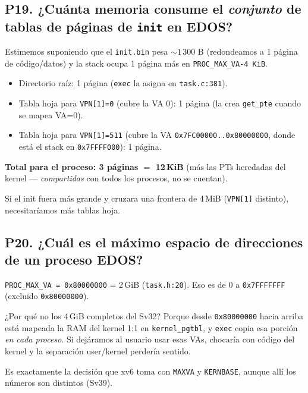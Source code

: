 \documentclass[11pt,a4paper]{article}
\begin{document}
\subsection*{P19. ¿Cuánta memoria consume el \emph{conjunto} de tablas de páginas de \texttt{init} en EDOS?}

\begin{respuesta}
Estimemos suponiendo que el \texttt{init.bin} pesa $\sim 1\,300$ B
(redondeamos a 1 página de código/datos) y la stack ocupa 1 página
más en \texttt{PROC\_MAX\_VA-4\,KiB}.

\begin{itemize}[leftmargin=*,nosep]
    \item Directorio raíz: 1 página (\texttt{exec} la asigna en
        \texttt{task.c:381}).
    \item Tabla hoja para \texttt{VPN[1]=0} (cubre la VA 0): 1
        página (la crea \texttt{get\_pte} cuando se mapea VA=0).
    \item Tabla hoja para \texttt{VPN[1]=511} (cubre la VA
        \texttt{0x7FC00000..0x80000000}, donde está el stack en
        \texttt{0x7FFFF000}): 1 página.
\end{itemize}

\textbf{Total para el proceso: 3 páginas $= $ 12\,KiB} (más las
PTs heredadas del kernel — \emph{compartidas} con todos los
procesos, no se cuentan).

Si el init fuera más grande y cruzara una frontera de 4\,MiB
(\texttt{VPN[1]} distinto), necesitaríamos más tablas hoja.
\end{respuesta}

\subsection*{P20. ¿Cuál es el máximo espacio de direcciones de un proceso EDOS?}

\begin{respuesta}
\texttt{PROC\_MAX\_VA = 0x80000000} = 2\,GiB (\texttt{task.h:20}).
Eso es de 0 a \texttt{0x7FFFFFFF} (excluido \texttt{0x80000000}).

¿Por qué no los 4\,GiB completos del Sv32? Porque desde
\texttt{0x80000000} hacia arriba está mapeada la RAM del kernel
1:1 en \texttt{kernel\_pgtbl}, y \texttt{exec} copia esa porción
\emph{en cada proceso}. Si dejáramos al usuario usar esas VAs,
chocaría con código del kernel y la separación user/kernel
perdería sentido.

Es exactamente la decisión que xv6 toma con \texttt{MAXVA} y
\texttt{KERNBASE}, aunque allí los números son distintos (Sv39).
\end{respuesta}
\end{document}

